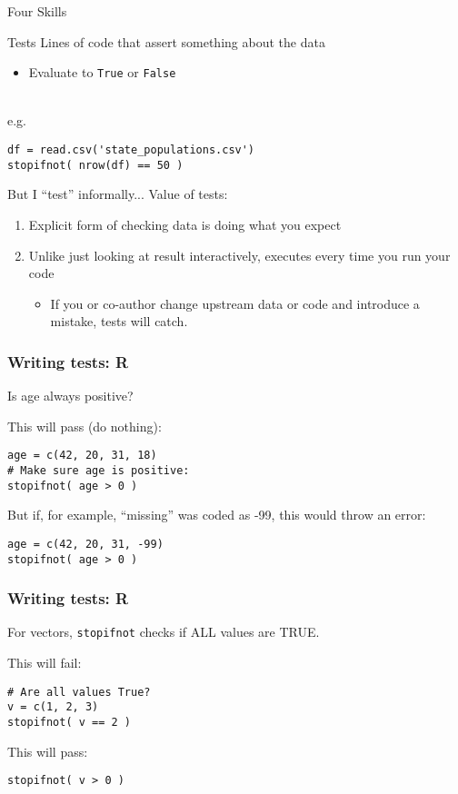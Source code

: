 \documentclass[11pt]{beamer}
\begin{document}
\begin{frame}[c]{Four Skills}
    \tableofcontents[current]
\end{frame}

\begin{frame}[c, fragile]{Tests}
Lines of code that assert something about the data
\begin{itemize}
    \item Evaluate to \texttt{True} or \texttt{False}
\end{itemize}
\vspace{0.5cm}\\
\pause e.g.
\begin{verbatim}
df = read.csv('state_populations.csv')
stopifnot( nrow(df) == 50 )
\end{verbatim}
\end{frame}

\begin{frame}[c]{But I ``test'' informally...}
Value of tests:
    \begin{enumerate}
        \pause \item Explicit form of checking data is doing what you expect
        \pause \item Unlike just looking at result interactively, executes \alert{every time you run your code}
        \begin{itemize}
            \pause \item If you or co-author change upstream data or code and introduce a mistake, tests will catch.
        \end{itemize}
    \end{enumerate}
\end{frame}


\begin{frame}[fragile]\frametitle{Writing tests: R}
Is age always positive?

\vspace{0.5cm}
This will pass (do nothing):
\begin{verbatim}
age = c(42, 20, 31, 18)
# Make sure age is positive:
stopifnot( age > 0 )
\end{verbatim}
\pause
\vspace{1cm}
But if, for example, ``missing'' was coded as -99, this would throw an error:
\begin{verbatim}
age = c(42, 20, 31, -99)
stopifnot( age > 0 )
\end{verbatim}
\end{frame}

\begin{frame}[fragile]\frametitle{Writing tests: R}
For vectors, \texttt{stopifnot} checks if ALL values are TRUE.
\vspace{1cm}

This will fail:
\begin{verbatim}
# Are all values True?
v = c(1, 2, 3)
stopifnot( v == 2 )
\end{verbatim}
\vspace{1cm}
This will pass:
\begin{verbatim}
stopifnot( v > 0 )
\end{verbatim}
\end{frame}
\end{document}
